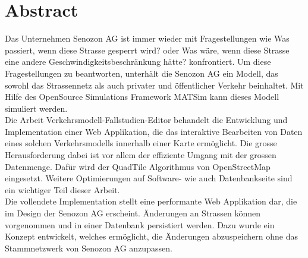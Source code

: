\chapter{Abstract}
Das Unternehmen Senozon AG ist immer wieder mit Fragestellungen wie \glqq{}Was passiert, wenn diese Strasse gesperrt wird?\grqq{} oder \glqq{}Was wäre, wenn diese Strasse eine andere Geschwindigkeitsbeschränkung hätte?\grqq{} konfrontiert. Um diese Fragestellungen zu beantworten, unterhält die Senozon AG ein Modell, das sowohl das Strassennetz als auch privater und öffentlicher Verkehr beinhaltet. Mit Hilfe des OpenSource Simulations Framework MATSim kann dieses Modell simuliert werden.\\
Die Arbeit \glqq{}Verkehrsmodell-Fallstudien-Editor\grqq{} behandelt die Entwicklung und Implementation einer Web Applikation, die das interaktive Bearbeiten von Daten eines solchen Verkehrsmodells innerhalb einer Karte ermöglicht. Die grosse Herausforderung dabei ist vor allem der effiziente Umgang mit der grossen Datenmenge. Dafür wird der QuadTile Algorithmus von OpenStreetMap \cite{OSMQuadTiles} eingesetzt. Weitere Optimierungen auf Software- wie auch Datenbankseite sind ein wichtiger Teil dieser Arbeit.\\
Die vollendete Implementation stellt eine performante Web Applikation dar, die im Design der Senozon AG erscheint. Änderungen an Strassen können vorgenommen und in einer Datenbank persistiert werden. Dazu wurde ein Konzept entwickelt, welches ermöglicht, die Änderungen abzuspeichern ohne das Stammnetzwerk von Senozon AG anzupassen.\\
